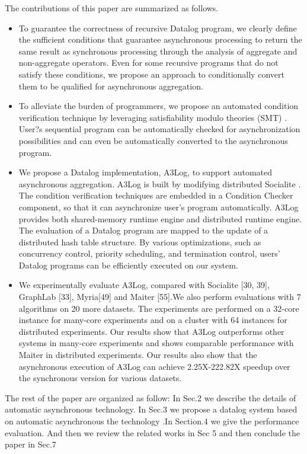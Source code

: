 The contributions of this paper are summarized as follows.
\begin{itemize}
	\item To guarantee the correctness of recursive Datalog program, we clearly define the sufficient conditions that guarantee asynchronous processing to return the same result as synchronous processing through the analysis of aggregate and non-aggregate operators. Even for some recursive programs that do not satisfy these conditions, we propose an approach to conditionally convert them to be qualified for asynchronous aggregation.
	\item To alleviate the burden of programmers, we propose an automated condition verification technique by leveraging satisfiability modulo theories
	(SMT) . User?s sequential program can be automatically checked for asynchronization possibilities and can even be automatically converted to the asynchronous program.
	\item We propose a Datalog implementation, A3Log, to support automated asynchronous aggregation. A3Log is built by modifying distributed Socialite \cite{}. The condition verification techniques are embedded in a Condition Checker component, so that it can asynchronize user's program automatically. A3Log provides both shared-memory runtime engine and distributed runtime engine. The evaluation of a Datalog program are mapped to the update of a distributed hash table structure. By various optimizations, such as concurrency control, priority scheduling, and termination control, users' Datalog programs can be efficiently executed on our system.
	\item We experimentally evaluate A3Log, compared with Socialite [30, 39], GraphLab [33], Myria[49] and Maiter [55].We also perform evaluations with 7 algorithms on 20 more datasets. The experiments are performed on a 32-core instance for many-core experiments and on a cluster with 64 instances for distributed experiments. Our results show that A3Log outperforms other systems in many-core experiments and shows comparable performance with Maiter in distributed experiments. Our results also show that the asynchronous execution of A3Log can achieve 2.25X-222.82X speedup over the synchronous version for various datasets.
\end{itemize}

The rest of the paper are organized as follow: In Sec.2 we describe the details of  automatic asynchronous technology. In Sec.3 we propose a datalog system based on automatic asynchronous the technology .In Section.4  we give the performance evaluation. And then we review the related works in Sec 5 and then conclude the paper in Sec.7
